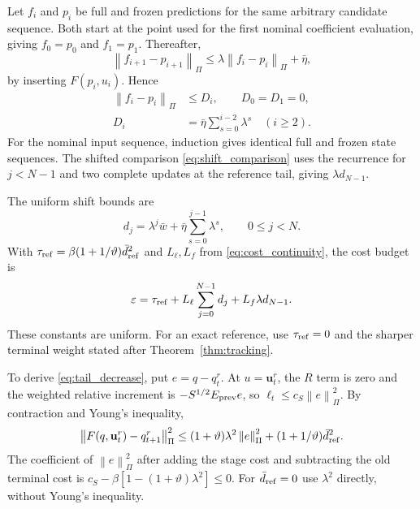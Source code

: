 \documentclass[journal]{IEEEtran}
\newcommand{\vu}{\mathbf{u}}
\newcommand{\norm}[1]{\left\lVert #1\right\rVert}
\begin{document}
Let $f_i$ and $p_i$ be full and frozen predictions for the same arbitrary candidate sequence. Both start at the point used for the first nominal coefficient evaluation, giving $f_0=p_0$ and $f_1=p_1$. Thereafter,
\begin{equation*}
\norm{f_{i+1}-p_{i+1}}_\Pi\le
\lambda\norm{f_i-p_i}_\Pi+\bar\eta,
\end{equation*}
by inserting $F(p_i,u_i)$. Hence
\begin{equation}
\begin{split}
\norm{f_i-p_i}_\Pi&\le D_i,\qquad D_0=D_1=0,\\
D_i&=\bar\eta\sum_{s=0}^{i-2}\lambda^s\quad(i\ge2).
\end{split}
\label{eq:frozen_discrepancy}
\end{equation}
For the nominal input sequence, induction gives identical full and frozen state sequences. The shifted comparison \eqref{eq:shift_comparison} uses the recurrence for $j<N-1$ and two complete updates at the reference tail, giving $\lambda d_{N-1}$.

The uniform shift bounds are
\begin{equation}
d_j=\lambda^j\bar w+\bar\eta\sum_{s=0}^{j-1}\lambda^s,\qquad 0\le j<N.
\label{eq:shift_error}
\end{equation}
With $\tau_{\rm ref}=\beta(1+1/\vartheta)\bar d_{\rm ref}^2$ and $L_\ell,L_f$ from \eqref{eq:cost_continuity}, the cost budget is
\begin{equation}
\varepsilon=\tau_{\rm ref}+L_\ell\sum_{j=0}^{N-1}d_j+L_f\lambda d_{N-1}.
\label{eq:epsilon_closed_loop}
\end{equation}
These constants are uniform. For an exact reference, use $\tau_{\rm ref}=0$ and the sharper terminal weight stated after Theorem~\ref{thm:tracking}.

To derive \eqref{eq:tail_decrease}, put $e=q-q_t^r$. At $u=\vu_t^r$, the $R$ term is zero and the weighted relative increment is $-S^{1/2}E_{\rm prev}e$, so $\ell_t\le c_S\norm{e}_\Pi^2$. By contraction and Young's inequality,
\begin{equation*}
\norm{F(q,\vu_t^r)-q_{t+1}^r}_\Pi^2
\le(1+\vartheta)\lambda^2\norm{e}_\Pi^2
+(1+1/\vartheta)\bar d_{\rm ref}^2.
\end{equation*}
The coefficient of $\norm{e}_\Pi^2$ after adding the stage cost and subtracting the old terminal cost is $c_S-\beta[1-(1+\vartheta)\lambda^2]\le0$. For $\bar d_{\rm ref}=0$ use $\lambda^2$ directly, without Young's inequality.
\end{document}
